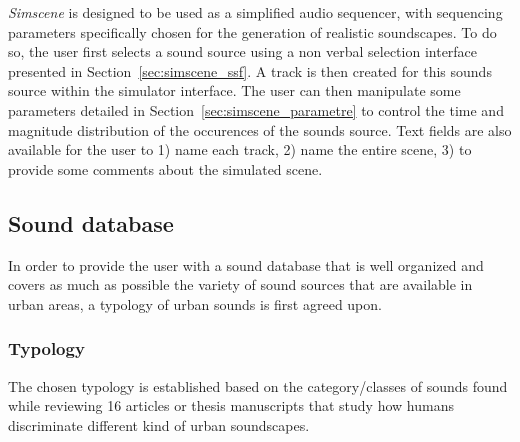 \documentclass[twoside,twocolumn]{article}
\begin{document}
\emph{Simscene} is designed to be used as a simplified audio sequencer, with sequencing parameters specifically chosen for the generation of realistic soundscapes. To do so, the user first selects a sound source using a non verbal selection interface presented in Section~\ref{sec:simscene_ssf}. A track is then created for this sounds source within the simulator interface. The user can then manipulate some parameters detailed in Section~\ref{sec:simscene_parametre} to control the time and magnitude distribution of the occurences of the sounds source. Text fields are also available for the user to 1) name each track, 2) name the entire scene, 3) to provide some comments about the simulated scene.

\subsection{Sound database}
\label{sec:simscene_sampleDataSet}

In order to provide the user with a sound database that is well organized and covers as much as possible the variety of sound sources that are available in urban areas, a typology of urban sounds is first agreed upon.

\subsubsection*{Typology}



The chosen typology is established based on the category/classes of sounds found while reviewing 16 articles or thesis manuscripts \cite{maffiolo_caracterisation_1999,raimbault2002simulation,guastavino_etude_2003,defreville2004aactivity,raimbault2005urban,dubois2006cognitive,devergie_relations_2006,guastavino2006ideal,niessen2010categories,maffiolo_caracterisation_1999,beaumont2004pertinence,polack2008perceptive,leobon_analyse_1986,brown2011towards} that study how humans discriminate different kind of urban soundscapes.
\end{document}
